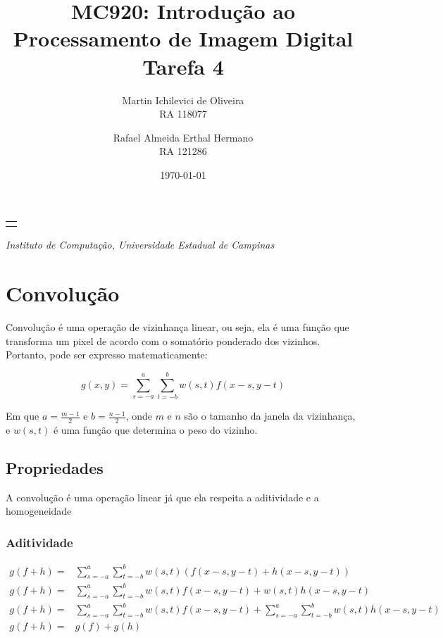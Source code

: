 \documentclass[10pt,a4paper]{article}
\makeatletter
\let\@institution\empty
\def\institution#1{\def\@institution{#1}}
\renewcommand{\maketitle}{
    \begin{center}
        {\Large\bfseries\@title\par\medskip}
        {\large
            \begin{tabular}[t]{c}%
                \@author
        \end{tabular}\par\medskip}
        {\itshape\@institution\par}
        {\itshape\@date\par}
\end{center}}
\makeatother
\begin{document}

\title{MC920: Introdução ao Processamento de Imagem Digital\\Tarefa 4}
\author{
    \begin{minipage}{6cm}
        \centering
        Martin Ichilevici de Oliveira\\
        RA 118077
    \end{minipage}
    \and
    \begin{minipage}{6cm}
        \centering
        Rafael Almeida Erthal Hermano\\
        RA 121286
    \end{minipage}
}
\institution{Instituto de Computação, Universidade Estadual de Campinas}
\date{\today}

\maketitle


\section{Convolução}
Convolução é uma operação de vizinhança linear, ou seja, ela é uma função que transforma um pixel de acordo com o somatório ponderado dos vizinhos.
Portanto, pode ser expresso matematicamente:

\begin{equation}
    g(x,y) = \sum_{s = -a}^{a}\sum_{t = -b}^{b}w(s,t) f(x - s, y - t)
    \label{eq:conv_eq}
\end{equation}

Em que $a = \frac{m-1}{2}$ e $b = \frac{n-1}{2}$, onde $m$ e $n$ são o tamanho da janela da vizinhança, e $w(s,t)$ é uma função que determina o peso do vizinho.

\subsection{Propriedades}
A convolução é uma operação linear já que ela respeita a aditividade e a homogeneidade

\subsubsection{Aditividade}
\begin{center}
$\begin{aligned}
    g(f+h) = &\sum_{s = -a}^{a}\sum_{t = -b}^{b}w(s,t) (f(x - s, y - t) + h(x - s, y - t)) \\
    g(f+h) = &\sum_{s = -a}^{a}\sum_{t = -b}^{b}w(s,t) f(x - s, y - t) + w(s,t) h(x - s, y - t)\\
    g(f+h) = &\sum_{s = -a}^{a}\sum_{t = -b}^{b}w(s,t) f(x - s, y - t) + \sum_{s = -a}^{a}\sum_{t = -b}^{b}w(s,t) h(x - s, y - t) \\
    g(f+h) = &g(f) + g(h)
\end{aligned}$
\end{center}
\end{document}
